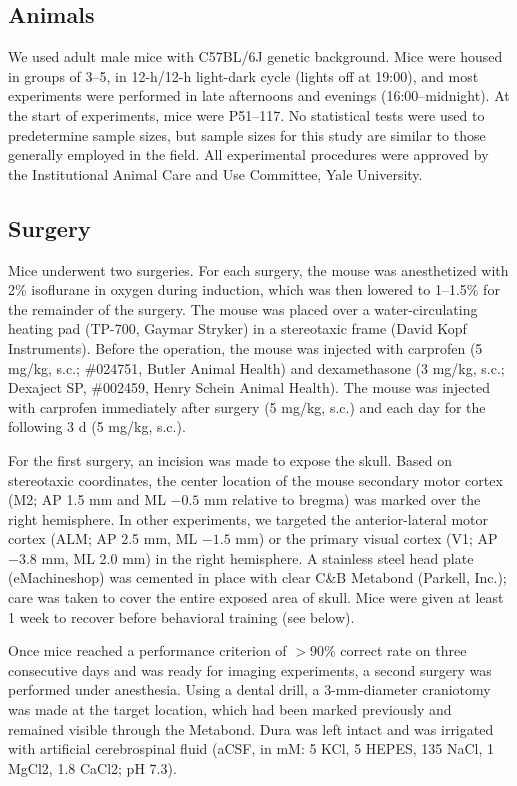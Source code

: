 
\subsection*{Animals}
We used adult male mice with C57BL/6J genetic background. Mice were housed in groups of 3--5, in 12-h/12-h light-dark cycle (lights off at 19:00), and most experiments were performed in late afternoons and evenings (16:00--midnight). At the start of experiments, mice were P51--117. No statistical tests were used to predetermine sample sizes, but sample sizes for this study are similar to those generally employed in the field. All experimental procedures were approved by the Institutional Animal Care and Use Committee, Yale University.

\subsection*{Surgery}
Mice underwent two surgeries. For each surgery, the mouse was anesthetized with 2\% isoflurane in oxygen during induction, which was then lowered to 1–1.5\% for the remainder of the surgery. The mouse was placed over a water-circulating heating pad (TP-700, Gaymar Stryker) in a stereotaxic frame (David Kopf Instruments). Before the operation, the mouse was injected with carprofen (5 mg/kg, s.c.; \#024751, Butler Animal Health) and dexamethasone (3 mg/kg, s.c.; Dexaject SP, \#002459, Henry Schein Animal Health). The mouse was injected with carprofen immediately after surgery (5 mg/kg, s.c.) and each day for the following 3 d (5 mg/kg, s.c.). 

For the first surgery, an incision was made to expose the skull. Based on stereotaxic coordinates, the center location of the mouse secondary motor cortex (M2; AP 1.5 mm and ML $-0.5$ mm relative to bregma) was marked over the right hemisphere. In other experiments, we targeted the anterior-lateral motor cortex (ALM; AP 2.5 mm, ML $-1.5$ mm) or the primary visual cortex (V1; AP $-3.8$ mm, ML 2.0 mm) in the right hemisphere. A stainless steel head plate (eMachineshop) was cemented in place with clear C\&B Metabond (Parkell, Inc.); care was taken to cover the entire exposed area of skull. Mice were given at least 1 week to recover before behavioral training (see below). 

Once mice reached a performance criterion of $>90\%$ correct rate on three consecutive days and was ready for imaging experiments, a second surgery was performed under anesthesia. Using a dental drill, a 3-mm-diameter craniotomy was made at the target location, which had been marked previously and remained visible through the Metabond. Dura was left intact and was irrigated with artificial cerebrospinal fluid (aCSF, in mM: 5 KCl, 5 HEPES, 135 NaCl, 1 MgCl2, 1.8 CaCl2; pH 7.3). 

